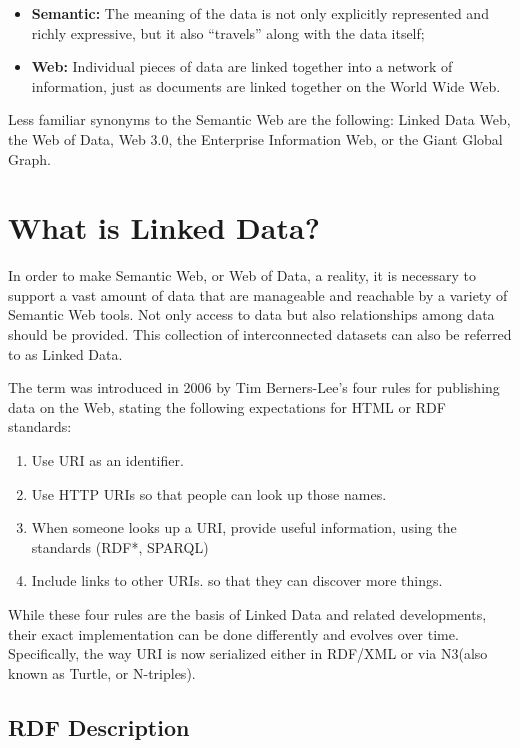 \documentclass[thesis=M,english,hidelinks]{FITthesis}[2019/12/23]
\begin{document}
\begin{itemize}
	\item  \textbf{Semantic:} The meaning of the data is not only explicitly represented and richly expressive, but it also “travels” along with the data itself;
	\item \textbf{Web:} Individual pieces of data are linked together into a network of information, just as documents are linked together on the World Wide Web.
\end{itemize}

Less familiar synonyms to the Semantic Web are the following: Linked Data Web, the Web of Data, Web 3.0, the Enterprise Information Web, or the Giant Global Graph.

\section{What is Linked Data?}

In order to make Semantic Web, or Web of Data, a reality, it is necessary to support a vast amount of data that are manageable and reachable by a variety of Semantic Web tools. Not only access to data but also relationships among data should be provided. This collection of interconnected datasets can also be referred to as Linked Data.

The term was introduced in 2006 by Tim Berners-Lee's four rules for publishing data on the Web\cite{Berners_LinkedData}, stating the following expectations for \gls{HTML} or \gls{RDF} standards:
\begin{enumerate}
	\item Use \gls{URI} as an identifier.
	\item Use \gls{HTTP} \gls{URI}s so that people can look up those names.
	\item When someone looks up a \gls{URI}, provide useful information, using the standards (\gls{RDF}*, \gls{SPARQL})
	\item Include links to other \gls{URI}s. so that they can discover more things.
\end{enumerate}

While these four rules are the basis of Linked Data and related developments, their exact implementation can be done differently and evolves over time. Specifically, the way \gls{URI} is now serialized either in \gls{RDF}/\gls{XML} or via N3(also known as Turtle, or N-triples).

\subsection{RDF Description}\label{rdf-description}
\end{document}
